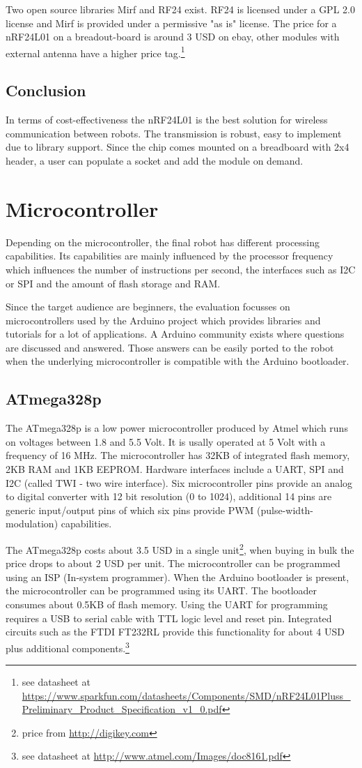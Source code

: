 Two open source libraries Mirf and RF24 exist. RF24 is licensed under a GPL 2.0 license and Mirf is provided under a permissive "as is" license. The price for a nRF24L01 on a breadout-board is around 3 USD on ebay, other modules with external antenna have a higher price tag.\footnote{see datasheet at \url{https://www.sparkfun.com/datasheets/Components/SMD/nRF24L01Pluss_Preliminary_Product_Specification_v1_0.pdf}}
\subsection{Conclusion}
In terms of cost-effectiveness the nRF24L01 is the best solution for wireless communication between robots. The transmission is robust, easy to implement due to library support. Since the chip comes mounted on a breadboard with 2x4 header, a user can populate a socket and add the module on demand.
\section{Microcontroller}
Depending on the microcontroller, the final robot has different processing capabilities. Its capabilities are mainly influenced by the processor frequency which influences the number of instructions per second, the interfaces such as I2C or SPI and the amount of flash storage and RAM.

Since the target audience are beginners, the evaluation focusses on microcontrollers used by the Arduino project which provides libraries and tutorials for a lot of applications. A Arduino community exists where questions are discussed and answered. Those answers can be easily ported to the robot when the underlying microcontroller is compatible with the Arduino bootloader.
\subsection{ATmega328p}
The ATmega328p is a low power microcontroller produced by Atmel which runs on voltages between 1.8 and 5.5 Volt. It is usally operated at 5 Volt with a frequency of 16 MHz. The microcontroller has 32KB of integrated flash memory, 2KB RAM and 1KB EEPROM. Hardware interfaces include a UART, SPI and I2C (called TWI - two wire interface). Six microcontroller pins provide an analog to digital converter with 12 bit resolution (0 to 1024), additional 14 pins are generic input/output pins of which six pins provide PWM (pulse-width-modulation) capabilities.

The ATmega328p costs about 3.5 USD in a single unit\footnote{price from \url{http://digikey.com}}, when buying in bulk the price drops to about 2 USD per unit. The microcontroller can be programmed using an ISP (In-system programmer). When the Arduino bootloader is present, the microcontroller can be programmed using its UART. The bootloader consumes about 0.5KB of flash memory. Using the UART for programming requires a USB to serial cable with TTL logic level and reset pin. Integrated circuits such as the FTDI  FT232RL provide this functionality for about 4 USD plus additional components.\footnote{see datasheet at \url{http://www.atmel.com/Images/doc8161.pdf}}
